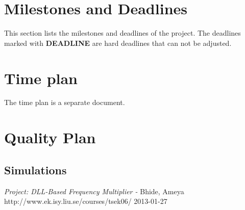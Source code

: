 \documentclass[a4paper,12pt]{article} \usepackage{graphicx}
\begin{document}
\section{Milestones and Deadlines}
This section lists the milestones and deadlines of the project.
The deadlines marked with \textbf{DEADLINE} are hard 
deadlines that can not be adjusted.

\begin{LIPSdeadlines}
\end{LIPSdeadlines}

\section{Time plan}
The time plan is a separate document.

\section{Quality Plan} 
\subsection{Simulations} 


\newpage 
\appendix 
\newpage


\begin{thebibliography}{99}
\textit{Project: DLL-Based Frequency Multiplier - } Bhide,
Ameya
\\ http://www.ek.isy.liu.se/courses/tsek06/ 2013-01-27
\end{thebibliography}
\end{document}
